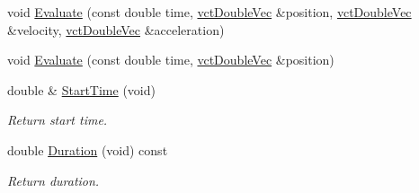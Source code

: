 \begin{DoxyCompactItemize}
void \hyperlink{classrob_l_s_p_b_a3d8541cca959dfe15cfb28a73cf71b77}{Evaluate} (const double time, \hyperlink{vct_dynamic_vector_types_8h_ade4b3068c86fb88f41af2e5187e491c2}{vct\-Double\-Vec} \&position, \hyperlink{vct_dynamic_vector_types_8h_ade4b3068c86fb88f41af2e5187e491c2}{vct\-Double\-Vec} \&velocity, \hyperlink{vct_dynamic_vector_types_8h_ade4b3068c86fb88f41af2e5187e491c2}{vct\-Double\-Vec} \&acceleration)
\item 
void \hyperlink{classrob_l_s_p_b_ab051b8339ff1cdd8f20bf9d596303266}{Evaluate} (const double time, \hyperlink{vct_dynamic_vector_types_8h_ade4b3068c86fb88f41af2e5187e491c2}{vct\-Double\-Vec} \&position)
\item 
double \& \hyperlink{classrob_l_s_p_b_abaf69e040bee6a191ad7e05ddc733ac9}{Start\-Time} (void)
\begin{DoxyCompactList}\small\item\em Return start time. \end{DoxyCompactList}\item 
double \hyperlink{classrob_l_s_p_b_a2977e4cd7d0148e294f7012ff2a58e89}{Duration} (void) const 
\begin{DoxyCompactList}\small\item\em Return duration. \end{DoxyCompactList}\end{DoxyCompactItemize}
